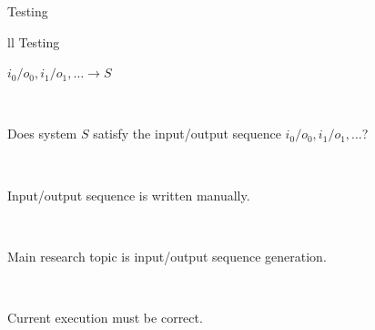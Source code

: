 \newcommand{\cell}[1]{\parbox[t]{.4\textwidth}{\vskip-5pt\raggedright#1\strut\par\vskip3pt}}

\newcommand{\smallcompare}[6]{
  \def\tempa{#1}%
  \def\tempb{#2}%
  \def\tempc{#3}%
  \def\tempd{#4}%
  \def\tempe{#5}%
  \def\tempf{#6}%
  \begin{zebratabular}{ll}
    \headerrow \tempa \\
    \cell{\tempb} \\
    \cell{\tempc} \\
    \cell{\tempd} \\
    \cell{\tempe} \\
    \cell{\tempf}
  \end{zebratabular}
}

\newcommand{\compare}[6]{
  \def\tempa{#1}%
  \def\tempb{#2}%
  \def\tempc{#3}%
  \def\tempd{#4}%
  \def\tempe{#5}%
  \def\tempf{#6}%
  \comparecontinue
}

\newcommand{\comparecontinue}[6]{
  \begin{zebratabular}{ll}
    \headerrow \tempa & #1 \\
    \cell{\tempb}
    &\cell{#2} \\
    \cell{\tempc}
    &\cell{#3} \\
    \cell{\tempd}
    &\cell{#4} \\
    \cell{\tempe}
    &\cell{#5} \\
    \cell{\tempf}
    &\cell{#6}
  \end{zebratabular}}

\begin{Frame}{Testing}
\begin{center}
  \smallcompare
    {Testing}
    {$i_0/o_0, i_1/o_1, \ldots \to S$}
    {Does system $S$ satisfy the \alert{input/output sequence}
             $i_0/o_0, i_1/o_1, \ldots$?\\}
    {Input/output sequence is written \alert{manually}.\\}
    {Main research topic is \alert{input/output sequence generation}.}
    {\alert{Current execution} must be correct.}
    
\end{center}
\end{Frame}

